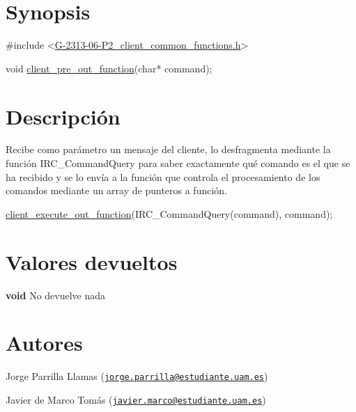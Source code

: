 \hypertarget{client_pre_out_function_synopsis_5}{}\section{Synopsis}\label{client_pre_out_function_synopsis_5}

\begin{DoxyCode}
\textcolor{preprocessor}{#include <\hyperlink{G-2313-06-P2__client__common__functions_8h}{G-2313-06-P2\_client\_common\_functions.h}>}

\textcolor{keywordtype}{void} \hyperlink{G-2313-06-P2__client_8h_a68019fe1e0edcc71bb3dadeb70a86dcd}{client\_pre\_out\_function}(\textcolor{keywordtype}{char}* command);
\end{DoxyCode}
 \hypertarget{client_pre_out_function_descripcion_5}{}\section{Descripción}\label{client_pre_out_function_descripcion_5}
Recibe como parámetro un mensaje del cliente, lo desfragmenta mediante la función I\+R\+C\+\_\+\+Command\+Query para saber exactamente qué comando es el que se ha recibido y se lo envía a la función que controla el procesamiento de los comandos mediante un array de punteros a función. 
\begin{DoxyCode}
\hyperlink{G-2313-06-P2__client_8h_a26512d35b24fec46c8fa4c803dc00867}{client\_execute\_out\_function}(IRC\_CommandQuery(command), command);
\end{DoxyCode}
\hypertarget{client_pre_out_function_return_5}{}\section{Valores devueltos}\label{client_pre_out_function_return_5}

\begin{DoxyItemize}
\item {\bfseries void} No devuelve nada 
\end{DoxyItemize}\hypertarget{client_pre_out_function_authors_5}{}\section{Autores}\label{client_pre_out_function_authors_5}

\begin{DoxyItemize}
\item Jorge Parrilla Llamas (\href{mailto:jorge.parrilla@estudiante.uam.es}{\tt jorge.\+parrilla@estudiante.\+uam.\+es}) 
\item Javier de Marco Tomás (\href{mailto:javier.marco@estudiante.uam.es}{\tt javier.\+marco@estudiante.\+uam.\+es}) 
\end{DoxyItemize}